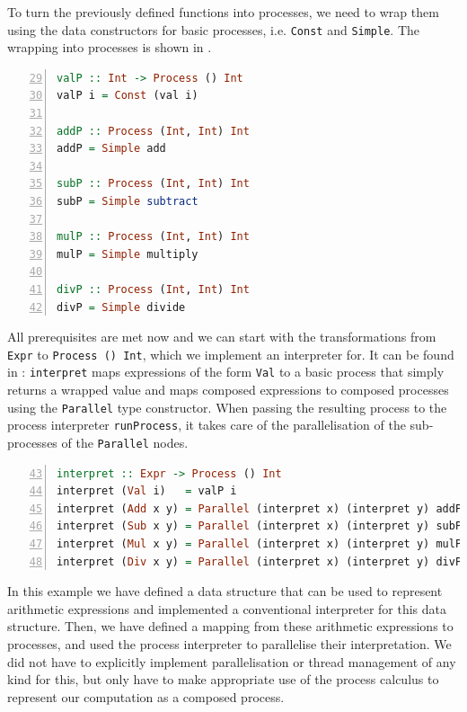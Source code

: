 To turn the previously defined functions into processes, we need to wrap them using the data constructors for basic processes, i.e. \texttt{Const} and \texttt{Simple}. The wrapping into processes is shown in .
\begin{lstlisting}[language=Haskell, caption=Creation of processes by wrapping them into \texttt{Simple} processes., label=lst:arith_wrapping, numbers=left, frame=bt, firstnumber=29]
valP :: Int -> Process () Int
valP i = Const (val i)

addP :: Process (Int, Int) Int
addP = Simple add

subP :: Process (Int, Int) Int
subP = Simple subtract

mulP :: Process (Int, Int) Int
mulP = Simple multiply

divP :: Process (Int, Int) Int
divP = Simple divide
\end{lstlisting}

All prerequisites are met now and we can start with the transformations from \texttt{Expr} to \texttt{Process () Int}, which we implement an interpreter for. It can be found in : \texttt{interpret} maps expressions of the form \texttt{Val} to a basic process that simply returns a wrapped value and maps composed expressions to composed processes using the \texttt{Parallel} type constructor. When passing the resulting process to the process interpreter \texttt{runProcess}, it takes care of the parallelisation of the sub-processes of the \texttt{Parallel} nodes.
\begin{lstlisting}[language=Haskell, caption=Transformation from \texttt{Expr} to processes., label=lst:arith_transformation, numbers=left, frame=bt, firstnumber=43]
interpret :: Expr -> Process () Int
interpret (Val i)   = valP i
interpret (Add x y) = Parallel (interpret x) (interpret y) addP
interpret (Sub x y) = Parallel (interpret x) (interpret y) subP
interpret (Mul x y) = Parallel (interpret x) (interpret y) mulP
interpret (Div x y) = Parallel (interpret x) (interpret y) divP
\end{lstlisting}

In this example we have defined a data structure that can be used to represent arithmetic expressions and implemented a conventional interpreter for this data structure. Then, we have defined a mapping from these arithmetic expressions to processes, and used the process interpreter to parallelise their interpretation. We did not have to explicitly implement parallelisation or thread management of any kind for this, but only have to make appropriate use of the process calculus to represent our computation as a composed process.